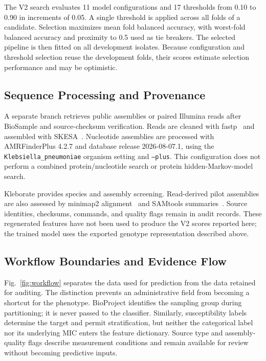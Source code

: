 \documentclass[conference]{IEEEtran}
\begin{document}
The V2 search evaluates 11 model configurations and 17 thresholds from 0.10 to 0.90 in increments of 0.05. A single threshold is applied across all folds of a candidate. Selection maximizes mean fold balanced accuracy, with worst-fold balanced accuracy and proximity to 0.5 used as tie breakers. The selected pipeline is then fitted on all development isolates. Because configuration and threshold selection reuse the development folds, their scores estimate selection performance and may be optimistic.

\subsection{Sequence Processing and Provenance}
A separate branch retrieves public assemblies or paired Illumina reads after BioSample and source-checksum verification. Reads are cleaned with fastp~\cite{fastp} and assembled with SKESA~\cite{skesa}. Nucleotide assemblies are processed with AMRFinderPlus 4.2.7 and database release 2026-08-07.1, using the \texttt{Klebsiella\_pneumoniae} organism setting and \texttt{--plus}. This configuration does not perform a combined protein/nucleotide search or protein hidden-Markov-model search.

Kleborate provides species and assembly screening. Read-derived pilot assemblies are also assessed by minimap2 alignment~\cite{minimap} and SAMtools summaries~\cite{samtools}. Source identities, checksums, commands, and quality flags remain in audit records. These regenerated features have not been used to produce the V2 scores reported here; the trained model uses the exported genotype representation described above.

\subsection{Workflow Boundaries and Evidence Flow}
Fig.~\ref{fig:workflow} separates the data used for prediction from the data retained for auditing. The distinction prevents an administrative field from becoming a shortcut for the phenotype. BioProject identifies the sampling group during partitioning; it is never passed to the classifier. Similarly, susceptibility labels determine the target and permit stratification, but neither the categorical label nor its underlying MIC enters the feature dictionary. Source type and assembly-quality flags describe measurement conditions and remain available for review without becoming predictive inputs.
\end{document}
